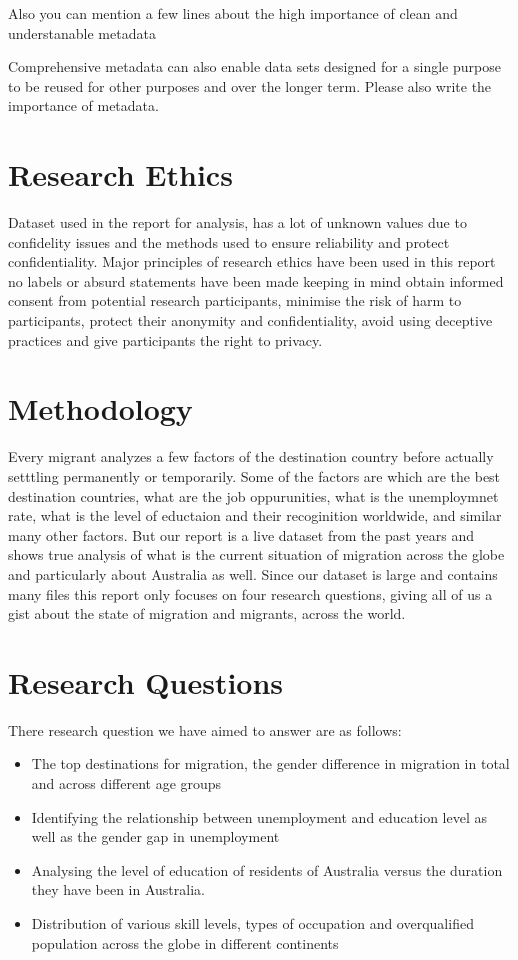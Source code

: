 \documentclass[11pt,a4paper,]{article}
\providecommand{\tightlist}{%
  \setlength{\itemsep}{0pt}\setlength{\parskip}{0pt}}
\begin{document}
Also you can mention a few lines about the high importance of clean and understanable metadata

Comprehensive metadata can also enable data sets designed for a single purpose to be reused for other purposes and over the longer term. Please also write the importance of metadata.

\section*{Research Ethics}

Dataset used in the report for analysis, has a lot of unknown values due to confidelity issues and the methods used to ensure reliability and protect confidentiality. Major principles of research ethics have been used in this report no labels or absurd statements have been made keeping in mind obtain informed consent from potential research participants, minimise the risk of harm to participants, protect their anonymity and confidentiality, avoid using deceptive practices and give participants the right to privacy.

\section*{Methodology}

Every migrant analyzes a few factors of the destination country before actually setttling permanently or temporarily. Some of the factors are which are the best destination countries, what are the job oppurunities, what is the unemploymnet rate, what is the level of eductaion and their recoginition worldwide, and similar many other factors. But our report is a live dataset from the past years and shows true analysis of what is the current situation of migration across the globe and particularly about Australia as well. Since our dataset is large and contains many files this report only focuses on four research questions, giving all of us a gist about the state of migration and migrants, across the world.

\section*{Research Questions}

There research question we have aimed to answer are as follows:

\begin{itemize}
\tightlist
\item
  The top destinations for migration, the gender difference in migration in total and across different age groups
\item
  Identifying the relationship between unemployment and education level as well as the gender gap in unemployment
\item
  Analysing the level of education of residents of Australia versus the duration they have been in Australia.
\item
  Distribution of various skill levels, types of occupation and overqualified population across the globe in different continents
\end{itemize}
\end{document}
